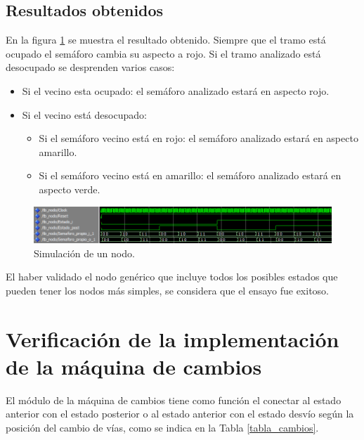 		\subsection{Resultados obtenidos}
			
			En la figura \ref{fig:Test_Nodo} se muestra el resultado obtenido. Siempre que el tramo está ocupado el semáforo cambia su aspecto a rojo. Si el tramo analizado está desocupado se desprenden varios casos:
			
			\begin{itemize}
				\item Si el vecino esta ocupado: el semáforo analizado estará en aspecto rojo.
				\item Si el vecino está desocupado:
				\begin{itemize}
					\item Si el semáforo vecino está en rojo: el semáforo analizado estará en aspecto amarillo.
					\item Si el semáforo vecino está en amarillo:  el semáforo analizado estará en aspecto verde.
				\end{itemize}				 
			\end{itemize}
			
			\begin{figure}[h]
			\centering
			\includegraphics[scale=0.6]{./Figures/Test/Nodo}
				\caption{Simulación de un nodo.}
				\label{fig:Test_Nodo}
			\end{figure}
				
			El haber validado el nodo genérico que incluye todos los posibles estados que pueden tener los nodos más simples, se considera que el ensayo fue exitoso.	
	
\section{Verificación de la implementación de la máquina de cambios}

	El módulo de la máquina de cambios tiene como función el conectar al estado anterior con el estado posterior o al estado anterior con el estado desvío según la posición del cambio de vías, como se indica en la Tabla \ref{tabla_cambios}.
	
